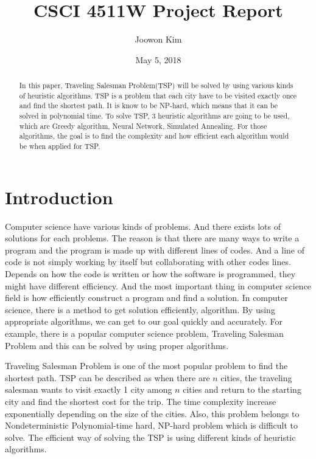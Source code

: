 \documentclass[12pt]{article}
\begin{document}
\title{CSCI 4511W Project Report}
\author{Joowon Kim}
\date{May 5, 2018}
\maketitle
\begin{abstract}
In this paper, Traveling Salesman Problem(TSP) will be solved by using various kinds of heuristic algorithms. TSP is a problem that each city have to be visited exactly once and find the shortest path.\cite{AI} It is know to be NP-hard, which means that it can be solved in polynomial time.\cite{NpHard} To solve TSP, 3 heuristic algorithms are going to be used, which are Greedy algorithm, Neural Network, Simulated Annealing. For those algorithms, the goal is to find the complexity and how efficient each algorithm would be when applied for TSP.
\end{abstract}


\section{Introduction}
Computer science have various kinds of problems. And there exists lots of solutions for each problems. The reason is that there are many ways to write a program and the program is made up with different lines of codes. And a line of code is not simply working by itself but collaborating with other codes lines. Depends on how the code is written or how the software is programmed, they might have different efficiency. And the most important thing in computer science field is how efficiently construct a program and find a solution. In computer science, there is a method to get solution efficiently, algorithm. By using appropriate algorithms, we can get to our goal quickly and accurately. For example, there is a popular computer science problem, Traveling Salesman Problem and this can be solved by using proper algorithms. \par
 
Traveling Salesman Problem is one of the most popular problem to find the shortest path. TSP can be described as when there are $n$ cities, the traveling salesman wants to visit exactly 1 city among $n$ cities and return to the starting city and find the shortest cost for the trip.\cite{TSP} The time complexity increase exponentially depending on the size of the cities. Also, this problem belongs to Nondeterministic Polynomial-time hard, NP-hard problem which is difficult to solve. The efficient way of solving the TSP is using different kinds of heuristic algorithms. \par
\end{document}

